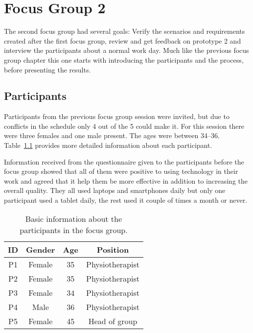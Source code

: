 \chapter{Focus Group 2}
\label{ch:focusGroup2}
The second focus group had several goals: Verify the scenarios and requirements created after the first focus group, review and get feedback on prototype 2 and interview the participants about a normal work day. Much like the previous focus group chapter this one starts with introducing the participants and the process, before presenting the results.

\section{Participants}
\label{sec:participants}
Participants from the previous focus group session were invited, but due to conflicts in the schedule only 4 out of the 5 could make it. For this session there were three females and one male present. The ages were between 34--36. Table~\ref{tab:participants} provides more detailed information about each participant.

Information received from the questionnaire given to the participants before the focus group showed that all of them were positive to using technology in their work and agreed that it help them be more effective in addition to increasing the overall quality. They all used laptops and smartphones daily but only one participant used a tablet daily, the rest used it couple of times a month or never.

\begin{table}[h!]
  \begin{center}
  \begin{tabular}{|c|c|c|c|}
    \hline
    \textbf{ID} & \textbf{Gender} & \textbf{Age} & \textbf{Position} \\ \hline
    P1 & Female & 35 & Physiotherapist \\ \hline
    P2 & Female & 35 & Physiotherapist \\ \hline
    P3 & Female & 34 & Physiotherapist \\ \hline
    P4 & Male & 36 & Physiotherapist \\ \hline
    P5 & Female & 45 & Head of group \\ \hline
  \end{tabular}
  \end{center}
  \caption{Basic information about the participants in the focus group.}
  \label{tab:participants}
\end{table}

